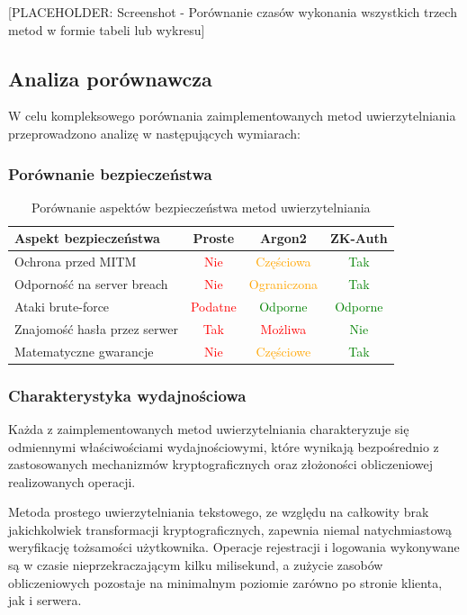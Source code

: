 \documentclass{article}
\begin{document}
[PLACEHOLDER: Screenshot - Porównanie czasów wykonania wszystkich trzech metod w formie tabeli lub wykresu]

\subsection{Analiza porównawcza}

W celu kompleksowego porównania zaimplementowanych metod uwierzytelniania przeprowadzono analizę w następujących wymiarach:

\subsubsection{Porównanie bezpieczeństwa}
\begin{table}[h]
\centering
\begin{tabular}{|l|c|c|c|}
\hline
\textbf{Aspekt bezpieczeństwa} & \textbf{Proste} & \textbf{Argon2} & \textbf{ZK-Auth} \\
\hline
Ochrona przed MITM & \textcolor{red}{Nie} & \textcolor{orange}{Częściowa} & \textcolor{green}{Tak} \\
\hline
Odporność na server breach & \textcolor{red}{Nie} & \textcolor{orange}{Ograniczona} & \textcolor{green}{Tak} \\
\hline
Ataki brute-force & \textcolor{red}{Podatne} & \textcolor{green}{Odporne} & \textcolor{green}{Odporne} \\
\hline
Znajomość hasła przez serwer & \textcolor{red}{Tak} & \textcolor{red}{Możliwa} & \textcolor{green}{Nie} \\
\hline
Matematyczne gwarancje & \textcolor{red}{Nie} & \textcolor{orange}{Częściowe} & \textcolor{green}{Tak} \\
\hline
\end{tabular}
\caption{Porównanie aspektów bezpieczeństwa metod uwierzytelniania}
\end{table}

\subsubsection{Charakterystyka wydajnościowa}
Każda z zaimplementowanych metod uwierzytelniania charakteryzuje się odmiennymi właściwościami wydajnościowymi, które wynikają bezpośrednio z zastosowanych mechanizmów kryptograficznych oraz złożoności obliczeniowej realizowanych operacji.

Metoda prostego uwierzytelniania tekstowego, ze względu na całkowity brak jakichkolwiek transformacji kryptograficznych, zapewnia niemal natychmiastową weryfikację tożsamości użytkownika. Operacje rejestracji i logowania wykonywane są w czasie nieprzekraczającym kilku milisekund, a zużycie zasobów obliczeniowych pozostaje na minimalnym poziomie zarówno po stronie klienta, jak i serwera.
\end{document}
